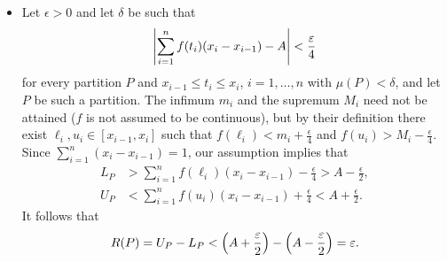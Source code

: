 \begin{problem}
\begin{solution}
\begin{itemize}
    Let $\epsilon > 0$. For any partition $P$, by definition of $m_i$ and $M_i$, we must have
    $$ L_P = \sum_{i=1}^n m_i (x_i - x_{i-1}) \leq \sum_{i=1}^n f(t_i) (x_i - x_{i-1}) \leq \sum_{i=1}^n M_i (x_i - x_{i-1}) = U_P. $$
    Let $\delta$ be such that $R(P) < \epsilon$ whenever $\mu(P) < \delta$, and let $P$ be such a partition. Then we find that
    $$ A - \epsilon < L_P \leq \sum_{i=1}^n f(t_i) (x_i - x_{i-1}) \leq U_P < A + \epsilon, $$
    which implies that
    $$ \abs{\sum_{i=1}^n f(t_i) (x_i - x_{i-1}) - A} < \epsilon. $$
    
    \item[] [(ii) $\implies$ (i)] Let $\epsilon > 0$ and let $\delta$ be such that
    $$ \left\lvert \sum_{i=1}^n f(t_i) (x_i - x_{i-1}) - A\right\rvert < \frac{\varepsilon}{4} $$
    for every partition $P$ and $x_{i-1} \leq t_i \leq x_i$, $i = 1, \ldots, n$ with $\mu(P) < \delta$, and let $P$ be such a partition. The infimum $m_i$ and the supremum $M_i$ need not be attained ($f$ is not assumed to be continuous), but by their definition there exist $\ell_i, u_i \in [x_{i-1}, x_i]$ such that $f(\ell_i) < m_i + \frac{\epsilon}{4}$ and $f(u_i) > M_i - \frac{\epsilon}{4}$. Since $\sum_{i=1}^n (x_i - x_{i-1}) = 1$, our assumption implies that
    \begin{align*}
        L_P &> \sum_{i=1}^n f(\ell_i) (x_i - x_{i-1}) - \frac{\epsilon}{4} > A - \frac{\epsilon}{2}, \\
        U_P &< \sum_{i=1}^n f(u_i) (x_i - x_{i-1}) + \frac{\epsilon}{4} < A + \frac{\epsilon}{2}.
    \end{align*}
    It follows that
    $$ R(P) = U_P - L_P < \left( A + \frac{\varepsilon}{2}\right) - \left( A - \frac{\varepsilon}{2}\right) = \varepsilon. $$
\end{itemize}
\end{solution}
\end{problem}

